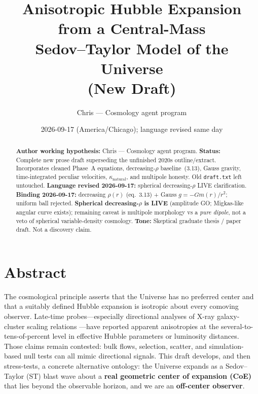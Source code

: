 \documentclass[11pt,a4paper]{article}
\title{Anisotropic Hubble Expansion from a Central-Mass\\
Sedov--Taylor Model of the Universe\\
\large (New Draft)}
\author{Chris --- Cosmology agent program}
\date{2026-09-17 (America/Chicago); language revised same day}
\begin{document}
\maketitle

\begin{abstract}
\noindent
\textbf{Author working hypothesis:} Chris --- Cosmology agent program.
\textbf{Status:} Complete new prose draft superseding the unfinished 2020s outline/extract. Incorporates cleaned Phase~A equations, decreasing-\(\rho\) baseline~(3.13), Gauss gravity, time-integrated peculiar velocities, \(\kappa_{\mathrm{natural}}\), and multipole honesty. Old \texttt{draft.txt} left untouched. \textbf{Language revised 2026-09-17:} spherical decreasing-\(\rho\) LIVE clarification.
\textbf{Binding 2026-09-17:} decreasing \(\rho(r)\) (eq.~3.13) + Gauss \(g=-Gm(r)/r^2\); uniform ball rejected. \textbf{Spherical decreasing-\(\rho\) is LIVE} (amplitude GO; Migkas-like angular curve exists); remaining caveat is multipole morphology vs a \emph{pure dipole}, not a veto of spherical variable-density cosmology.
\textbf{Tone:} Skeptical graduate thesis / paper draft. Not a discovery claim.
\end{abstract}

\section*{Abstract}

The cosmological principle asserts that the Universe has no preferred center and that a suitably defined Hubble expansion is isotropic about every comoving observer. Late-time probes---especially directional analyses of X-ray galaxy-cluster scaling relations \cite{Migkas2020,Migkas2021}---have reported apparent anisotropies at the several-to-tens-of-percent level in effective Hubble parameters or luminosity distances. Those claims remain contested: bulk flows, selection, scatter, and simulation-based null tests can all mimic directional signals. This draft develops, and then stress-tests, a concrete alternative ontology: the Universe expands as a Sedov--Taylor (ST) blast wave about a \textbf{real geometric center of expansion (CoE)} that lies beyond the observable horizon, and we are an \textbf{off-center observer}.
\end{document}
